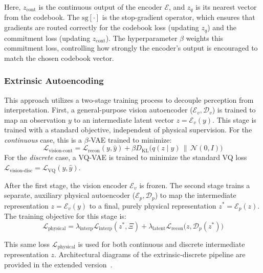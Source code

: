 \documentclass[nonacm,sigconf]{acmart}
\begin{document}
Here, \(z_{\text{cont}}\) is the continuous output of the encoder \(\mathcal{E}\), and \(z_q\) is its nearest vector from the codebook. The \(\text{sg}[\cdot]\) is the stop-gradient operator, which ensures that gradients are routed correctly for the codebook loss (updating \(z_q\)) and the commitment loss (updating \(z_{\text{cont}}\)). The hyperparameter \(\beta\) weights this commitment loss, controlling how strongly the encoder's output is encouraged to match the chosen codebook vector.


\subsubsection{Extrinsic Autoencoding}


This approach utilizes a two-stage training process to decouple perception from interpretation.
First, a general-purpose vision autoencoder (\(\mathcal{E}_v, \mathcal{D}_v\)) is trained to map an observation \(y\) to an intermediate latent vector \(z = \mathcal{E}_v(y)\). This stage is trained with a standard objective, independent of physical supervision.
For the \textit{continuous} case, this is a \(\beta\)-VAE trained to minimize:
\begin{equation}
    \mathcal{L}_{\text{vision-cont}} = \mathcal{L}_{\text{recon}}(y, \hat{y}) + \beta D_{\text{KL}}\big(q(z \mid y) \,\|\, \mathcal{N}(0, I)\big)
\end{equation}
For the \textit{discrete} case, a VQ-VAE is trained to minimize the standard VQ loss \(\mathcal{L}_{\text{vision-disc}} = \mathcal{L}_{\text{VQ}}(y, \hat{y})\).


After the first stage, the vision encoder \(\mathcal{E}_v\) is frozen. The second stage trains a separate, auxiliary {physical autoencoder} (\(\mathcal{E}_p, \mathcal{D}_p\)) to map the intermediate representation \(z = \mathcal{E}_v(y)\) to a final, purely physical representation \(z^* = \mathcal{E}_p(z)\). The training objective for this stage is:
\begin{equation}
    \mathcal{L}_{\text{physical}} = \lambda_{\text{interp}}\mathcal{L}_{\text{interp}}(z^*, \Xi) + \lambda_{\text{latent}}\mathcal{L}_{\text{recon}}\big(z,  \mathcal{D}_p(z^*))
\end{equation}

This same loss \(\mathcal{L}_{\text{physical}}\) is used for both continuous and discrete intermediate representation \(z\). Architectural diagrams of the extrinsic-discrete pipeline are provided in the extended version~\cite{extended}.
\end{document}
